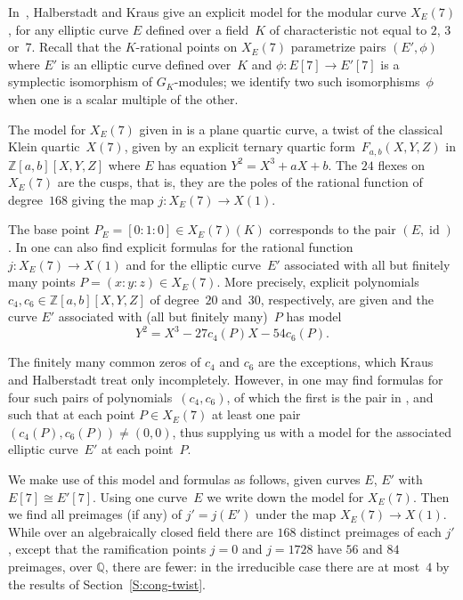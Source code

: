 \documentclass[12pt, reqno]{amsart}
\newcommand{\Q}{\mathbb{Q}}
\newcommand{\Z}{\mathbb{Z}}
\DeclareMathOperator{\id}{id}
\numberwithin{equation}{section}
\theoremstyle{definition}
\theoremstyle{remark}
\begin{document}
In~\cite{Halberstadt-Kraus-XE7}, Halberstadt and Kraus give an
explicit model for the modular curve $X_E(7)$, for any elliptic curve
$E$ defined over a field~$K$ of characteristic not equal to $2$, $3$
or~$7$. Recall that the $K$-rational points on $X_E(7)$ parametrize
pairs $(E',\phi)$ where $E'$ is an elliptic curve defined over~$K$ and
$\phi:E[7]\to E'[7]$ is a symplectic isomorphism of $G_K$-modules; we
identify two such isomorphisms~$\phi$ when one is a scalar multiple of
the other.

The model for $X_E(7)$ given in \cite{Halberstadt-Kraus-XE7} is a
plane quartic curve, a twist of the classical Klein quartic~$X(7)$,
given by an explicit ternary quartic form~$F_{a,b}(X,Y,Z)$ in
$\Z[a,b][X,Y,Z]$ where $E$ has equation $Y^2=X^3+aX+b$.  The $24$
flexes on $X_E(7)$ are the cusps, that is, they are the poles of the
rational function of degree~$168$ giving the map $j:X_E(7)\to
X(1)$.

The base point $P_E=[0:1:0]\in X_E(7)(K)$ corresponds to the pair
$(E,\id)$.  In \cite{Halberstadt-Kraus-XE7} one can also find explicit formulas
for the rational function $j:X_E(7)\to X(1)$ and for the elliptic curve~$E'$
associated with all 
but finitely many points $P=(x:y:z)\in
X_E(7)$. More precisely, 
explicit polynomials $c_4, c_6 \in \Z[a,b][X,Y,Z]$
of degree~$20$ and~$30$, respectively, are given and the curve $E'$ associated with (all but finitely many)~$P$ has model
\[Y^2=X^3-27c_4(P)X-54c_6(P).\]

The finitely many common zeros of $c_4$
and $c_6$ are the exceptions, which Kraus and Halberstadt treat only
incompletely.  However, in \cite{Fisher} one may find formulas for
four such pairs of polynomials~$(c_4,c_6)$, of which the first is the pair in
\cite{Halberstadt-Kraus-XE7}, and such that at each point $P\in
X_E(7)$ at least one pair $(c_4(P),c_6(P))\not=(0,0)$, thus supplying
us with a model for the associated elliptic 
curve~$E'$ at each point~$P$.

We make use of this model and formulas as follows, given curves $E$,
$E'$ with $E[7]\cong E'[7]$.  Using one curve~$E$ we write down the
model for $X_E(7)$.  Then we find all preimages (if any) of $j'=j(E')$
under the map $X_E(7)\to X(1)$.  While over an algebraically closed
field there are $168$ distinct preimages of each $j'$, except that the
ramification points $j=0$ and $j=1728$ have $56$ and $84$ preimages,
over $\Q$, there are fewer: in the irreducible case there are at
most~$4$ by the results of Section~\ref{S:cong-twist}.
\end{document}
